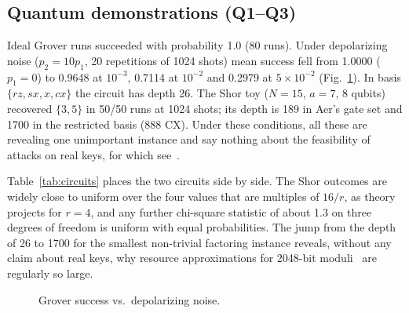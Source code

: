 \documentclass[conference]{IEEEtran}
\begin{document}
\subsection{Quantum demonstrations (Q1--Q3)}
Ideal Grover runs succeeded with probability 1.0 (80 runs). Under depolarizing noise ($p_2=10p_1$, 20 repetitions of 1024 shots) mean success fell from 1.0000 ($p_1=0$) to 0.9648 at $10^{-3}$, 0.7114 at $10^{-2}$ and 0.2979 at $5\times 10^{-2}$ (Fig.~\ref{fig:grover}). In basis $\{rz, sx, x, cx\}$ the circuit has depth 26. The Shor toy ($N=15$, $a=7$, 8 qubits) recovered $\{3,5\}$ in 50/50 runs at 1024 shots; its depth is 189 in Aer's gate set and 1700 in the restricted basis (888 CX). Under these conditions, all these are revealing one unimportant instance and say nothing about the feasibility of attacks on real keys, for which see~\cite{gidney2021}.

Table~\ref{tab:circuits} places the two circuits side by side. The Shor outcomes are widely close to uniform over the four values that are multiples of $16/r$, as theory projects for $r=4$, and any further chi-square statistic of about 1.3 on three degrees of freedom is uniform with equal probabilities. The jump from the depth of 26 to 1700 for the smallest non-trivial factoring instance reveals, without any claim about real keys, why resource approximations for 2048-bit moduli~\cite{gidney2021} are regularly so large.

\begin{figure}[t]
\centering
{}
\caption{Grover success vs.\ depolarizing noise.}
\label{fig:grover}
\end{figure}
\end{document}
